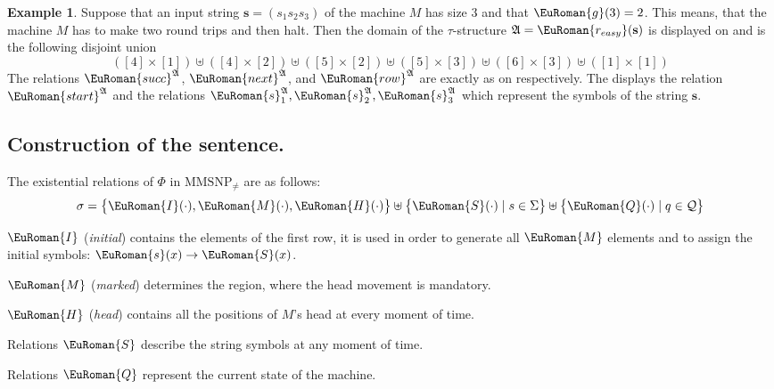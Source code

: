 \documentclass[10pt,a4paper]{amsart}
\theoremstyle{plain}
\theoremstyle{definition}
\newtheorem{exa}[thm]{Example}
\numberwithin{equation}{section}
\newcommand{\eurm}[1]{\EuRoman{#1}} %
\newcommand{\euca}[1]{\mathcal{#1}} %
\newcommand{\structure}[1]{\mathfrak{#1}} %
\newcommand{\tuple}[1]{\mathbf{#1}} %
\newcommand{\rel}[1]{\eurm{#1}} %
\newcommand{\family}[1]{\euca{#1}} %
\newcommand{\func}[1]{\eurm{#1}}  %
\newcommand{\MMSNPineq}[0]{\ensuremath{\textrm{MMSNP}_{\not=}}}
\begin{document}
\begin{exa}\label{ex:construction}
Suppose that an input string $\tuple{s} = (s_1s_2s_3)$ of the machine $M$ has size $3$ and that $\func{g}(3)=2$.
This means, that the machine $M$ has to make two round trips and then halt.
Then the domain of the $\tau$-structure $\structure{A} = \func{r_{easy}}(\tuple{s})$ is displayed on  and is the following disjoint union
\begin{equation*}
([4]\times[1])\uplus([4]\times[2])\uplus([5]\times[2])\uplus([5]\times[3])\uplus([6]\times[3])\uplus([1]\times[1])
\end{equation*}
The relations $\rel{succ}^\structure{A}$, $\rel{next}^\structure{A}$, and $\rel{row}^\structure{A}$ are exactly as on  respectively.
The  displays the relation $\rel{start}^\structure{A}$ and the relations $\rel{s}_1^\structure{A},\rel{s}_2^\structure{A},\rel{s}_3^\structure{A}$ which represent the symbols of the string $\tuple{s}$.
\end{exa}

\subsection{Construction of the sentence.}\label{subsection:construction_of_phi}
The existential relations of $\Phi$ in $\MMSNPineq$ are as follows:
\begin{equation*}
\sigma = \bigl\{ \rel{I}(\cdot),\rel{M}(\cdot),\rel{H}(\cdot)\bigr\}\uplus \bigl\{\rel{S}(\cdot)\mid s\in\Sigma\bigr\}\uplus\bigl\{\rel{Q}(\cdot)\mid q\in\family{Q}\bigr\}
\end{equation*} 
\begin{compactitem}
\item $\rel{I}$ (\emph{initial}) contains the elements of the first row, it is used in order to generate all $\rel{M}$ elements and to assign the initial symbols: $\rel{s}(x)\to\rel{S}(x)$. %
\item $\rel{M}$ (\emph{marked}) determines the region, where the head movement is mandatory. %
\item $\rel{H}$ (\emph{head}) contains all the positions of $M$'s head at every moment of time. %
\item Relations $\rel{S}$ describe the string symbols at any moment of time.
\item Relations $\rel{Q}$ represent the current state of the machine.
\end{compactitem}
\end{document}
